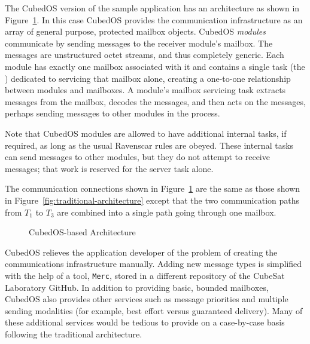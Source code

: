 The CubedOS version of the sample application has an architecture as shown in
Figure~\ref{fig:cubedos-architecture}. In this case CubedOS provides the communication
infrastructure as an array of general purpose, protected mailbox objects. CubedOS
\textit{modules} communicate by sending messages to the receiver module's mailbox. The messages
are unstructured octet streams, and thus completely generic. Each module has exactly one mailbox
associated with it and contains a single task (the ) dedicated to servicing
that mailbox alone, creating a one-to-one relationship between modules and mailboxes. A module's
mailbox servicing task extracts messages from the mailbox, decodes the messages, and then acts
on the messages, perhaps sending messages to other modules in the process.

Note that CubedOS modules are allowed to have additional internal tasks, if required, as long as
the usual Ravenscar rules are obeyed. These internal tasks can send messages to other modules,
but they do not attempt to receive messages; that work is reserved for the server task alone.

The communication connections shown in Figure~\ref{fig:cubedos-architecture} are the same as
those shown in Figure~\ref{fig:traditional-architecture} except that the two communication paths
from $T_1$ to $T_3$ are combined into a single path going through one mailbox.

\begin{figure}[tbhp]
  \center
  \caption{CubedOS-based Architecture}
  \label{fig:cubedos-architecture}
\end{figure}

CubedOS relieves the application developer of the problem of creating the communications
infrastructure manually. Adding new message types is simplified with the help of a tool,
\texttt{Merc}, stored in a different repository of the CubeSat Laboratory GitHub. In addition to
providing basic, bounded mailboxes, CubedOS also provides other services such as message
priorities and multiple sending modalities (for example, best effort versus guaranteed
delivery).  Many
of these additional services would be tedious to provide on a case-by-case basis following the
traditional architecture.

